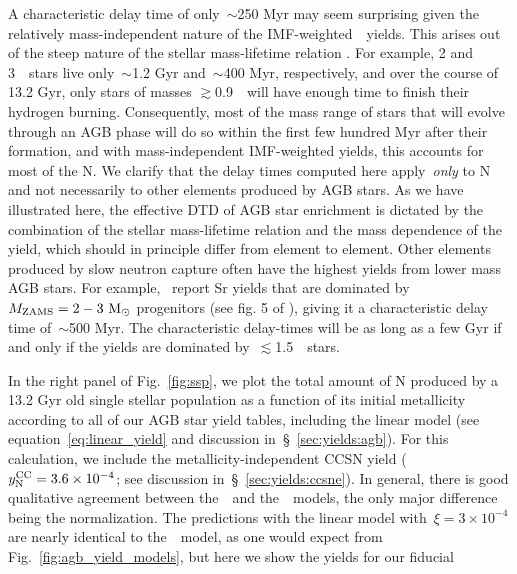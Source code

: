 \documentclass[ms.tex]{subfiles}
\begin{document}
A characteristic delay time of only~$\sim$250 Myr may seem surprising given
the relatively mass-independent nature of the IMF-weighted~\cristallo~yields.
This arises out of the steep nature of the stellar mass-lifetime relation
\citep[e.g.][]{Larson1974, Maeder1989, Padovani1993}.
For example, 2 and 3~\msun~stars live only~$\sim$1.2 Gyr and~$\sim$400 Myr,
respectively, and over the course of 13.2 Gyr, only stars of masses
$\gtrsim$0.9~\msun~will have enough time to finish their hydrogen burning.
Consequently, most of the mass range of stars that will evolve through an
AGB phase will do so within the first few hundred Myr after their formation,
and with mass-independent IMF-weighted yields, this accounts for most of the
N.
We clarify that the delay times computed here apply~\textit{only} to N and
not necessarily to other elements produced by AGB stars.
As we have illustrated here, the effective DTD of AGB star enrichment is
dictated by the combination of the stellar mass-lifetime relation and the
mass dependence of the yield, which should in principle differ from element to
element.
Other elements produced by slow neutron capture often have the highest yields
from lower mass AGB stars.
For example,~\citet{Cristallo2011, Cristallo2015} report Sr yields that are
dominated by~$M_\text{ZAMS} = 2 - 3~\text{M}_\odot$ progenitors (see fig. 5 of
\citealp{Johnson2020}), giving it a characteristic delay time of~$\sim$500 Myr.
The characteristic delay-times will be as long as a few Gyr if and only if the
yields are dominated by~$\lesssim$1.5~\msun~stars.
\par
In the right panel of Fig.~\ref{fig:ssp}, we plot the total amount of N
produced by a 13.2 Gyr old single stellar population as a function of its
initial metallicity according to all of our AGB star yield tables, including
the linear model (see equation~\ref{eq:linear_yield} and discussion
in~\S~\ref{sec:yields:agb}).
For this calculation, we include the metallicity-independent CCSN yield
($y_\text{N}^\text{CC} = 3.6\times10^{-4}$; see discussion in~\S~\ref{sec:yields:ccsne}).
In general, there is good qualitative agreement between the~\cristallo~and
the~\ventura~models, the only major difference being the normalization.
The predictions with the linear model with~$\xi = 3\times10^{-4}$ are nearly
identical to the~\cristallo~model, as one would expect from
Fig.~\ref{fig:agb_yield_models}, but here we show the yields for our fiducial
\end{document}
